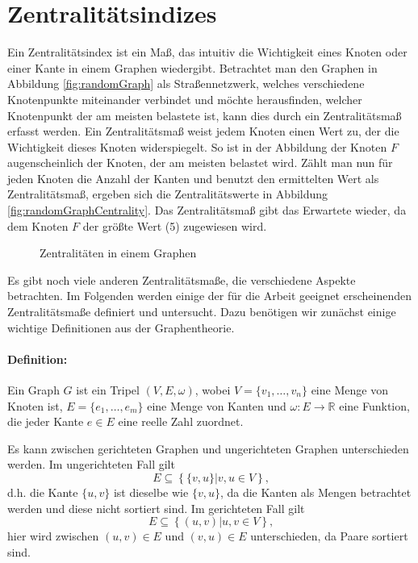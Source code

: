 \section{Zentralitätsindizes}
\label{sec:centralities}

Ein Zentralitätsindex ist ein Maß, das intuitiv die Wichtigkeit eines Knoten oder einer Kante in einem Graphen wiedergibt. Betrachtet man den Graphen in Abbildung \ref{fig:randomGraph} als Straßennetzwerk, welches verschiedene Knotenpunkte miteinander verbindet und möchte herausfinden, welcher Knotenpunkt der am meisten belastete ist, kann dies durch ein Zentralitätsmaß erfasst werden. Ein Zentralitätsmaß weist jedem Knoten einen Wert zu, der die Wichtigkeit dieses Knoten widerspiegelt. So ist in der Abbildung der Knoten $F$ augenscheinlich der Knoten, der am meisten belastet wird. Zählt man nun für jeden Knoten die Anzahl der Kanten und benutzt den ermittelten Wert als Zentralitätsmaß, ergeben sich die Zentralitätswerte in Abbildung \ref{fig:randomGraphCentrality}. Das Zentralitätsmaß gibt das Erwartete wieder, da dem Knoten $F$ der größte Wert (5) zugewiesen wird. 

\begin{figure}[ht]
\centering
  \subfigure[Straßennetzwerk]{
    
    \label{fig:randomGraph}
  }

\caption{Zentralitäten in einem Graphen}
\end{figure}

Es gibt noch viele anderen Zentralitätsmaße, die verschiedene Aspekte betrachten. Im Folgenden werden einige der für die Arbeit geeignet erscheinenden Zentralitätsmaße definiert und untersucht. Dazu benötigen wir zunächst einige wichtige Definitionen aus der Graphentheorie. 

\paragraph{Definition:} Ein Graph $G$ ist ein Tripel $(V,E,\omega)$, wobei $V=\lbrace v_1,\ldots,v_n\rbrace$ eine Menge von Knoten ist, $E=\lbrace e_1,\ldots,e_m \rbrace$ eine Menge von Kanten und $\omega: E \rightarrow \mathbb{R}$ eine Funktion, die jeder Kante $e \in E$ eine reelle Zahl zuordnet. 

Es kann zwischen gerichteten Graphen und ungerichteten Graphen unterschieden werden. Im ungerichteten Fall gilt
\[
E \subseteq \left\lbrace \{v,u\} | v,u \in V \right\rbrace \text{,}
\]
d.h. die Kante $\lbrace u,v \rbrace$ ist dieselbe wie $\lbrace v,u \rbrace$, da die Kanten als Mengen betrachtet werden und diese nicht sortiert sind. Im gerichteten Fall gilt
\[
E \subseteq \left\lbrace (u,v) | u,v \in V\right\rbrace \text{,}
\]
hier wird zwischen $(u,v) \in E$ und $(v,u) \in E$ unterschieden, da Paare sortiert sind.

